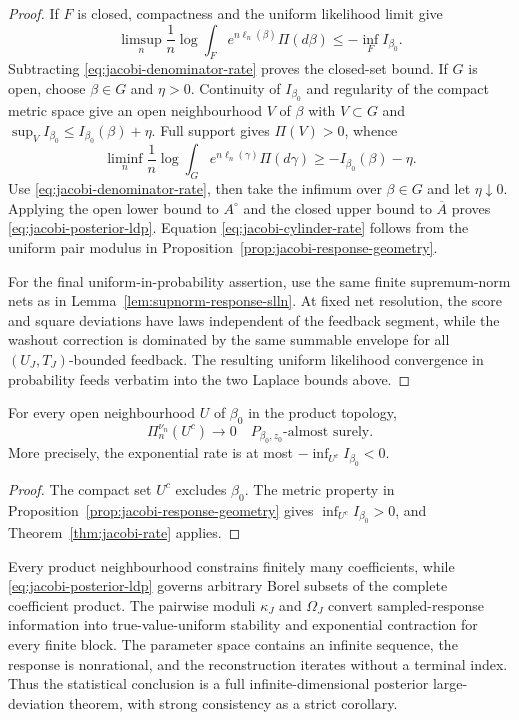 \begin{proof}
If \(F\) is closed, compactness and the uniform likelihood limit give
\[
 \limsup_n\frac1n\log\int_F e^{n\ell_n(\beta)}\Pi(d\beta)
 \le-\inf_F I_{\beta_0}.
\]
Subtracting \eqref{eq:jacobi-denominator-rate} proves the closed-set bound.
If \(G\) is open, choose \(\beta\in G\) and \(\eta>0\).  Continuity of
\(I_{\beta_0}\) and regularity of the compact metric space give an open
neighbourhood \(V\) of \(\beta\) with \(V\subset G\) and
\(\sup_VI_{\beta_0}\le I_{\beta_0}(\beta)+\eta\).  Full support gives
\(\Pi(V)>0\), whence
\[
 \liminf_n\frac1n\log\int_G e^{n\ell_n(\gamma)}\Pi(d\gamma)
 \ge-I_{\beta_0}(\beta)-\eta.
\]
Use \eqref{eq:jacobi-denominator-rate}, then take the infimum over
\(\beta\in G\) and let \(\eta\downarrow0\).  Applying the open lower bound
to \(A^\circ\) and the closed upper bound to \(\overline A\) proves
\eqref{eq:jacobi-posterior-ldp}.  Equation
\eqref{eq:jacobi-cylinder-rate} follows from the uniform pair modulus in
Proposition~\ref{prop:jacobi-response-geometry}.

For the final uniform-in-probability assertion, use the same finite
supremum-norm nets as in Lemma~\ref{lem:supnorm-response-slln}.  At fixed net
resolution, the score and square deviations have laws independent of the
feedback segment, while the washout correction is dominated by the same
summable envelope for all \((U_J,T_J)\)-bounded feedback.  The resulting
uniform likelihood convergence in probability feeds verbatim into the two
Laplace bounds above.
\end{proof}

\begin{corollary}
\label{thm:jacobi-consistency}
For every open neighbourhood \(U\) of \(\beta_0\) in the product topology,
\[
 \Pi_n^{\nu_n}(U^c)\longrightarrow0
 \quad P_{\beta_0,z_0}\text{-almost surely}.
\]
More precisely, the exponential rate is at most
\(-\inf_{U^c}I_{\beta_0}<0\).
\end{corollary}

\begin{proof}
The compact set \(U^c\) excludes \(\beta_0\).  The metric property in
Proposition~\ref{prop:jacobi-response-geometry} gives
\(\inf_{U^c}I_{\beta_0}>0\), and Theorem~\ref{thm:jacobi-rate} applies.
\end{proof}

\begin{remark}
Every product neighbourhood constrains finitely many coefficients, while
\eqref{eq:jacobi-posterior-ldp} governs arbitrary Borel subsets of the complete
coefficient product.  The pairwise moduli \(\kappa_J\) and \(\Omega_J\)
convert sampled-response information into true-value-uniform stability and
exponential contraction for every finite block.  The parameter space contains
an infinite sequence, the response is nonrational, and the reconstruction
iterates without a terminal index.  Thus the statistical conclusion is a full
infinite-dimensional posterior large-deviation theorem, with strong
consistency as a strict corollary.
\end{remark}
